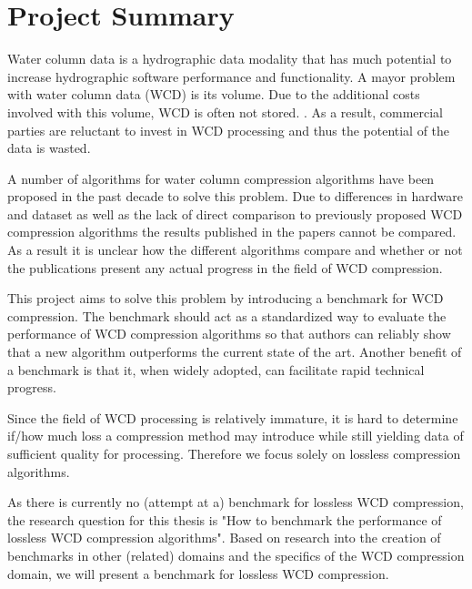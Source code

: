 \chapter{Project Summary}

Water column data is a hydrographic data modality that has much potential to increase hydrographic software performance and functionality\cite{clarke2006applications}\cite{buelens2006computational}. A mayor problem with water column data (WCD) is its volume. Due to the additional costs involved with this volume, WCD is often not stored. \cite{buelens2006computational} \cite{moszynski2013novel}\cite{beaudoin2010application}\cite{amblasreal}. As a result, commercial parties are reluctant to invest in WCD processing and thus the potential of the data is wasted. 

A number of algorithms for water column compression algorithms have been proposed in the past decade \cite{moszynski2013novel}\cite{beaudoin2010application}\cite{amblasreal} to solve this problem. Due to differences in hardware and dataset as well as the lack of direct comparison to previously proposed WCD compression algorithms the results published in the papers cannot be compared. As a result it is unclear how the different algorithms compare and whether or not the publications present any actual progress in the field of WCD compression. 

This project aims to solve this problem by introducing a benchmark for WCD compression. The benchmark should act as a standardized way to evaluate the performance of WCD compression algorithms so that authors can reliably show that a new algorithm outperforms the current state of the art. Another benefit of a benchmark is that it, when widely adopted, can facilitate rapid technical progress.\cite{sim2003using}

Since the field of WCD processing is relatively immature, it is hard to determine if/how much loss a compression method may introduce while still yielding data of sufficient quality for processing. Therefore we focus solely on lossless compression algorithms.  

As there is currently no (attempt at a) benchmark for lossless WCD compression, the research question for this thesis is "How to benchmark the performance of lossless WCD compression algorithms". Based on research into the creation of benchmarks in other (related) domains and the specifics of the WCD compression domain, we will present a benchmark for lossless WCD compression. 

